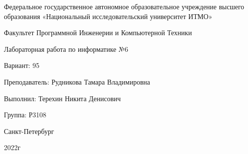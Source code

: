 \thispagestyle{empty}
\begin{figure*}
\LARGE
\begin{center}
Федеральное государственное автономное образовательное учреждение высшего образования «Национальный исследовательский университет ИТМО»
\bigskip

Факультет Программной Инженерии и Компьютерной Техники 
\vspace{8cm}

Лабораторная работа по информатике №6
\bigskip

Вариант: 95
\vspace{5cm}

\end{center}
\begin{flushright}
Преподаватель: Рудникова Тамара Владимировна

Выполнил: Терехин Никита Денисович

Группа: Р3108
\vspace{5cm}

\end{flushright}
\begin{center}
Санкт-Петербург
    
2022г
\end{center}
\newpage
\end{figure*}